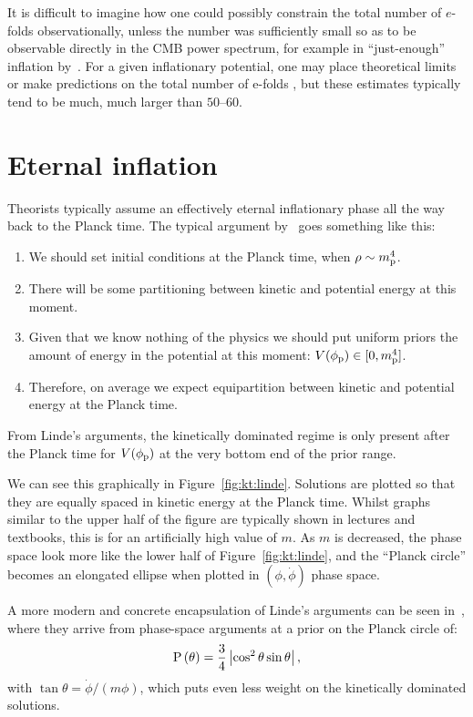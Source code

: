 It is difficult to imagine how one could possibly constrain the total number of \(e\)-folds observationally, unless the number was sufficiently small so as to be observable directly in the CMB power spectrum, for example in ``just-enough'' inflation by~\cite{Ramirez_excluded_2009,Ramirez_predictions_2012}. For a given inflationary potential, one may place theoretical limits or make predictions on the total number of e-folds \citep{how_many_e_folds}, but these estimates typically tend to be much, much larger than \(50\)--\(60\).

\section{Eternal inflation}
Theorists typically assume an effectively eternal inflationary phase all the way back to the Planck time.  
The typical argument by~\cite{Linde_review} goes something like this:
\begin{enumerate}
  \item We should set initial conditions at the Planck time, when
    \(\rho\sim m_{\mathrm{p}}^4\).
  \item There will be some partitioning between kinetic and potential
    energy at this moment.
  \item Given that we know nothing of the physics we should put
    uniform priors the amount of energy in the potential at this
    moment: \(V(\phi_{\mathrm{p}})\in[0,m_{\mathrm{p}}^4]\).
  \item Therefore, on average we expect equipartition between kinetic
    and potential energy at the Planck time.
\end{enumerate}

From Linde's arguments, the kinetically dominated regime is only present
after the Planck time for \(V(\phi_{\mathrm{p}})\) at the very bottom end of the
prior range.

We can see this graphically in Figure~\ref{fig:kt:linde}. Solutions are plotted so that they are equally spaced in kinetic energy at the Planck time. Whilst graphs similar to the upper half of the figure are typically shown in lectures and textbooks, this is for an artificially high value of \(m\). As \(m\) is decreased, the phase space look more like the lower half of Figure~\ref{fig:kt:linde}, and the ``Planck circle'' becomes an elongated ellipse when plotted in \((\phi, \dot{\phi})\) phase space. 

A more modern and concrete encapsulation of Linde's arguments can be seen in~\cite{how_many_e_folds}, where they arrive from phase-space arguments at a prior on the Planck circle of:
\begin{equation}
  \mathrm{P}\left(\theta\right) = \frac{3}{4} \left|\cos^2\theta\sin\theta\right|,
\end{equation}
with \(\tan\theta  = \dot{\phi}/(m\phi)\), which puts even less weight on the kinetically dominated solutions.

